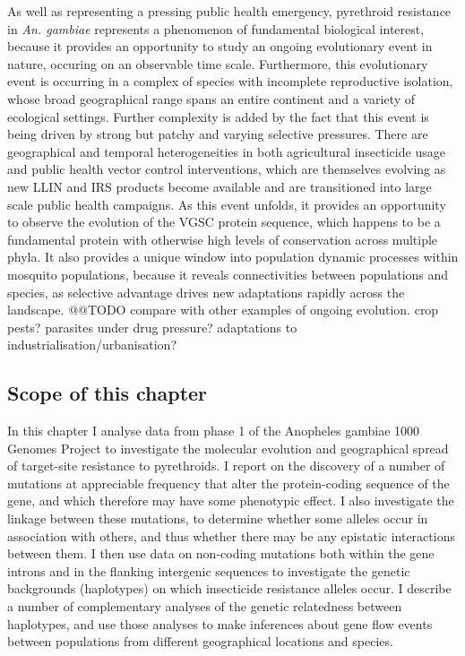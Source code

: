 \documentclass[a4paper,11pt,abstracton,hidelinks]{scrartcl}
\begin{document}
%
As well as representing a pressing public health emergency, pyrethroid resistance in \textit{An. gambiae} represents a phenomenon of fundamental biological interest, because it provides an opportunity to study an ongoing evolutionary event in nature, occuring on an observable time scale.
%
Furthermore, this evolutionary event is occurring in a complex of species with incomplete reproductive isolation, whose broad geographical range spans an entire continent and a variety of ecological settings.
%
Further complexity is added by the fact that this event is being driven by strong but patchy and varying selective pressures.
%
There are geographical and temporal heterogeneities in both agricultural insecticide usage and public health vector control interventions, which are themselves evolving as new LLIN and IRS products become available and are transitioned into large scale public health campaigns.
%
As this event unfolds, it provides an opportunity to observe the evolution of the VGSC protein sequence, which happens to be a fundamental protein with otherwise high levels of conservation across multiple phyla.
%
It also provides a unique window into population dynamic processes within mosquito populations, because it reveals connectivities between populations and species, as selective advantage drives new adaptations rapidly across the landscape.
%
@@TODO compare with other examples of ongoing evolution. crop pests? parasites under drug pressure? adaptations to industrialisation/urbanisation?


\subsection*{Scope of this chapter}


%
In this chapter I analyse data from phase 1 of the Anopheles gambiae 1000 Genomes Project to investigate the molecular evolution and geographical spread of target-site resistance to pyrethroids.
%
I report on the discovery of a number of mutations at appreciable frequency that alter the protein-coding sequence of the gene, and which therefore may have some phenotypic effect.
%
I also investigate the linkage between these mutations, to determine whether some alleles occur in association with others, and thus whether there may be any epistatic interactions between them.
%
I then use data on non-coding mutations both within the gene introns and in the flanking intergenic sequences to investigate the genetic backgrounds (haplotypes) on which insecticide resistance alleles occur.
%
I describe a number of complementary analyses of the genetic relatedness between haplotypes, and use those analyses to make inferences about gene flow events between populations from different geographical locations and species.
\end{document}
